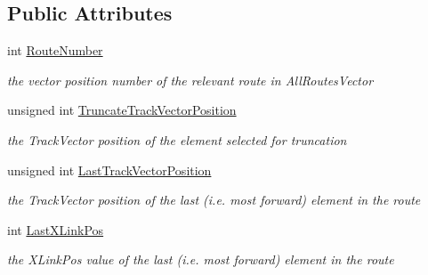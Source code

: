 \subsection*{Public Attributes}
\begin{DoxyCompactItemize}
\item 
\mbox{\label{class_t_all_routes_1_1_t_locked_route_class_a2656289cb7f1553d6189a03dda77fe16}} 
int \mbox{\hyperlink{class_t_all_routes_1_1_t_locked_route_class_a2656289cb7f1553d6189a03dda77fe16}{Route\+Number}}
\begin{DoxyCompactList}\small\item\em the vector position number of the relevant route in All\+Routes\+Vector \end{DoxyCompactList}\item 
\mbox{\label{class_t_all_routes_1_1_t_locked_route_class_a225d5505b6ec121e35defa4f228798f5}} 
unsigned int \mbox{\hyperlink{class_t_all_routes_1_1_t_locked_route_class_a225d5505b6ec121e35defa4f228798f5}{Truncate\+Track\+Vector\+Position}}
\begin{DoxyCompactList}\small\item\em the Track\+Vector position of the element selected for truncation \end{DoxyCompactList}\item 
\mbox{\label{class_t_all_routes_1_1_t_locked_route_class_a9a989378c6e20fc0c68bbbebe87016c3}} 
unsigned int \mbox{\hyperlink{class_t_all_routes_1_1_t_locked_route_class_a9a989378c6e20fc0c68bbbebe87016c3}{Last\+Track\+Vector\+Position}}
\begin{DoxyCompactList}\small\item\em the Track\+Vector position of the last (i.\+e. most forward) element in the route \end{DoxyCompactList}\item 
\mbox{\label{class_t_all_routes_1_1_t_locked_route_class_acc5cb84f033b12d8216816b8a6a6c0a3}} 
int \mbox{\hyperlink{class_t_all_routes_1_1_t_locked_route_class_acc5cb84f033b12d8216816b8a6a6c0a3}{Last\+X\+Link\+Pos}}
\begin{DoxyCompactList}\small\item\em the X\+Link\+Pos value of the last (i.\+e. most forward) element in the route \end{DoxyCompactList}\item 

\end{DoxyCompactItemize}
